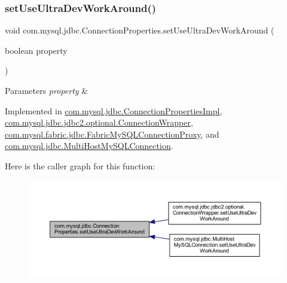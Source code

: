 \subsubsection{\texorpdfstring{set\+Use\+Ultra\+Dev\+Work\+Around()}{setUseUltraDevWorkAround()}}
{\footnotesize\ttfamily void com.\+mysql.\+jdbc.\+Connection\+Properties.\+set\+Use\+Ultra\+Dev\+Work\+Around (\begin{DoxyParamCaption}\item[{boolean}]{property }\end{DoxyParamCaption})}


\begin{DoxyParams}{Parameters}
{\em property} & \\
\hline
\end{DoxyParams}


Implemented in \mbox{\hyperlink{classcom_1_1mysql_1_1jdbc_1_1_connection_properties_impl_acfd325b2c44c9e5ff9b6befde38fe659}{com.\+mysql.\+jdbc.\+Connection\+Properties\+Impl}}, \mbox{\hyperlink{classcom_1_1mysql_1_1jdbc_1_1jdbc2_1_1optional_1_1_connection_wrapper_a975975f724eda5350e1b096e2525a70c}{com.\+mysql.\+jdbc.\+jdbc2.\+optional.\+Connection\+Wrapper}}, \mbox{\hyperlink{classcom_1_1mysql_1_1fabric_1_1jdbc_1_1_fabric_my_s_q_l_connection_proxy_add9b57388e2662f5c31f6127be01a335}{com.\+mysql.\+fabric.\+jdbc.\+Fabric\+My\+S\+Q\+L\+Connection\+Proxy}}, and \mbox{\hyperlink{classcom_1_1mysql_1_1jdbc_1_1_multi_host_my_s_q_l_connection_a2280fcb76a916e625848333e80572871}{com.\+mysql.\+jdbc.\+Multi\+Host\+My\+S\+Q\+L\+Connection}}.

Here is the caller graph for this function\+:\nopagebreak
\begin{figure}[H]
\begin{center}
\leavevmode
\includegraphics[width=350pt]{interfacecom_1_1mysql_1_1jdbc_1_1_connection_properties_af0a84465de479a1eea05763a2ae4cc37_icgraph}
\end{center}
\end{figure}
\mbox{\label{interfacecom_1_1mysql_1_1jdbc_1_1_connection_properties_a5a30b9513cdbfaf75d822a3942c5bf6b}} 
